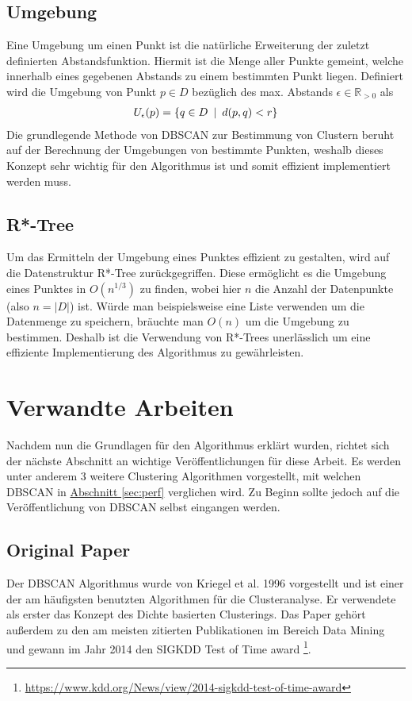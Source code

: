 \documentclass{lni}
\begin{document}
\subsection{Umgebung}
Eine Umgebung um einen Punkt ist die natürliche Erweiterung der zuletzt definierten Abstandsfunktion. Hiermit ist die Menge aller Punkte gemeint, welche innerhalb eines gegebenen Abstands zu einem bestimmten Punkt liegen.
Definiert wird die Umgebung von Punkt $p \in D$ bezüglich des max. Abstands $\epsilon \in \mathbb{R}_{>0}$ als
\begin{align}
    U_{\epsilon}(p) = \{ q \in D \enspace | \enspace d(p,q) < r \} \notag
\end{align}
Die grundlegende Methode von DBSCAN zur Bestimmung von Clustern beruht auf der Berechnung der Umgebungen von bestimmte Punkten, weshalb dieses Konzept sehr wichtig für den Algorithmus ist und somit effizient implementiert werden muss.


\subsection{R*-Tree}
\label{sec:rtree}
Um das Ermitteln der Umgebung eines Punktes effizient zu gestalten, wird auf die Datenstruktur R*-Tree \cite{R*} zurückgegriffen. Diese ermöglicht es die Umgebung eines Punktes in $O(n^{1/3})$ \cite{REV} zu finden, wobei hier $n$ die Anzahl der Datenpunkte (also $n = |D|$) ist. Würde man beispielsweise eine Liste verwenden um die Datenmenge zu speichern, bräuchte man $O(n)$ um die Umgebung zu bestimmen. Deshalb ist die Verwendung von R*-Trees unerlässlich um eine effiziente Implementierung des Algorithmus zu gewährleisten.

%
%

\section{Verwandte Arbeiten}
Nachdem nun die Grundlagen für den Algorithmus erklärt wurden, richtet sich der nächste Abschnitt an wichtige Veröffentlichungen für diese Arbeit. Es werden unter anderem 3 weitere Clustering Algorithmen vorgestellt, mit welchen DBSCAN in \hyperref[sec:perf]{Abschnitt \ref{sec:perf}} verglichen wird. Zu Beginn sollte jedoch auf die Veröffentlichung von DBSCAN selbst eingangen werden.


\subsection{Original Paper}
Der DBSCAN Algorithmus wurde von Kriegel et al. 1996 vorgestellt \cite{DBSCAN} und ist einer der am häufigsten benutzten Algorithmen für die Clusteranalyse. Er verwendete als erster das Konzept des Dichte basierten Clusterings. Das Paper gehört außerdem zu den am meisten zitierten Publikationen im Bereich Data Mining und gewann im Jahr 2014 den \glqq SIGKDD Test of Time award\grqq{} \footnote{\href{https://www.kdd.org/News/view/2014-sigkdd-test-of-time-award}{https://www.kdd.org/News/view/2014-sigkdd-test-of-time-award}}.
\end{document}
